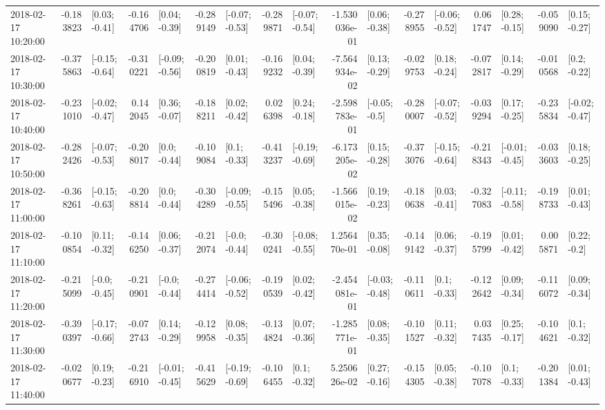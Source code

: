 \begin{tabular}{lrlrlrlrlrlrlrlrl}
2018-02-17 10:20:00 & -0.183823 &   [0.03; -0.41] & -0.164706 &   [0.04; -0.39] & -0.289149 &  [-0.07; -0.53] & -0.289871 &  [-0.07; -0.54] & -1.530036e-01 &   [0.06; -0.38] & -0.278955 &  [-0.06; -0.52] &  0.061747 &   [0.28; -0.15] & -0.059090 &   [0.15; -0.27] \\
2018-02-17 10:30:00 & -0.375863 &  [-0.15; -0.64] & -0.310221 &  [-0.09; -0.56] & -0.200819 &   [0.01; -0.43] & -0.169232 &   [0.04; -0.39] & -7.564934e-02 &   [0.13; -0.29] & -0.029753 &   [0.18; -0.24] & -0.072817 &   [0.14; -0.29] & -0.010568 &    [0.2; -0.22] \\
2018-02-17 10:40:00 & -0.231010 &  [-0.02; -0.47] &  0.142045 &   [0.36; -0.07] & -0.188211 &   [0.02; -0.42] &  0.026398 &   [0.24; -0.18] & -2.598783e-01 &   [-0.05; -0.5] & -0.280007 &  [-0.07; -0.52] & -0.039294 &   [0.17; -0.25] & -0.235834 &  [-0.02; -0.47] \\
2018-02-17 10:50:00 & -0.282426 &  [-0.07; -0.53] & -0.208017 &    [0.0; -0.44] & -0.109084 &    [0.1; -0.33] & -0.413237 &  [-0.19; -0.69] & -6.173205e-02 &   [0.15; -0.28] & -0.373076 &  [-0.15; -0.64] & -0.218343 &  [-0.01; -0.45] & -0.033603 &   [0.18; -0.25] \\
2018-02-17 11:00:00 & -0.368261 &  [-0.15; -0.63] & -0.208814 &    [0.0; -0.44] & -0.304289 &  [-0.09; -0.55] & -0.155496 &   [0.05; -0.38] & -1.566015e-02 &   [0.19; -0.23] & -0.180638 &   [0.03; -0.41] & -0.327083 &  [-0.11; -0.58] & -0.198733 &   [0.01; -0.43] \\
2018-02-17 11:10:00 & -0.100854 &   [0.11; -0.32] & -0.146250 &   [0.06; -0.37] & -0.212074 &   [-0.0; -0.44] & -0.300241 &  [-0.08; -0.55] &  1.256470e-01 &   [0.35; -0.08] & -0.149142 &   [0.06; -0.37] & -0.195799 &   [0.01; -0.42] &  0.005871 &    [0.22; -0.2] \\
2018-02-17 11:20:00 & -0.215099 &   [-0.0; -0.45] & -0.210901 &   [-0.0; -0.44] & -0.274414 &  [-0.06; -0.52] & -0.190539 &   [0.02; -0.42] & -2.454081e-01 &  [-0.03; -0.48] & -0.110611 &    [0.1; -0.33] & -0.122642 &   [0.09; -0.34] & -0.116072 &   [0.09; -0.34] \\
2018-02-17 11:30:00 & -0.390397 &  [-0.17; -0.66] & -0.072743 &   [0.14; -0.29] & -0.129958 &   [0.08; -0.35] & -0.134824 &   [0.07; -0.36] & -1.285771e-01 &   [0.08; -0.35] & -0.101527 &   [0.11; -0.32] &  0.037435 &   [0.25; -0.17] & -0.104621 &    [0.1; -0.32] \\
2018-02-17 11:40:00 & -0.020677 &   [0.19; -0.23] & -0.216910 &  [-0.01; -0.45] & -0.415629 &  [-0.19; -0.69] & -0.106455 &    [0.1; -0.32] &  5.250626e-02 &   [0.27; -0.16] & -0.154305 &   [0.05; -0.38] & -0.107078 &    [0.1; -0.33] & -0.201384 &   [0.01; -0.43] \\

\end{tabular}
